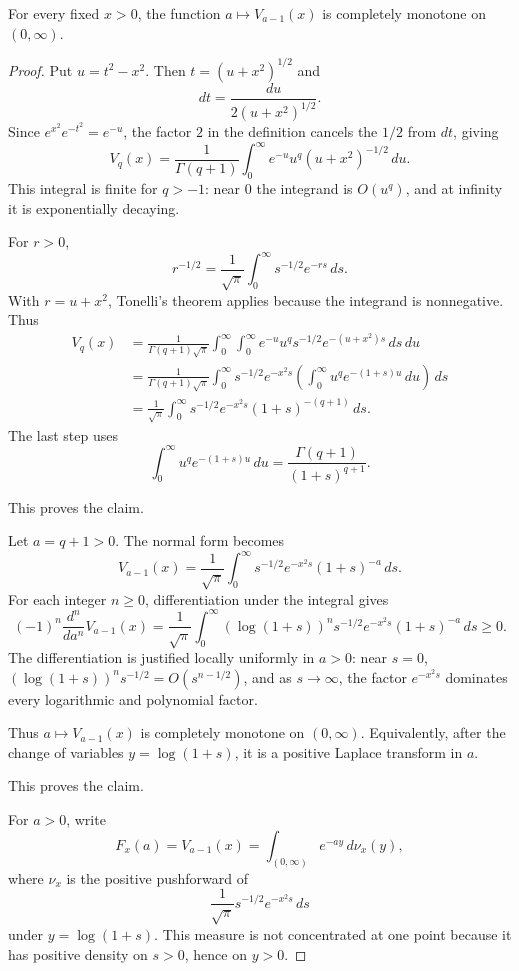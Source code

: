\begin{proposition}
\label{res:baricz-vq-q-complete-monotonicity}
For every fixed \(x>0\), the function \(a\mapsto V_{a-1}(x)\) is completely monotone on \((0,\infty)\).
\end{proposition}
\begin{proof}
Put \(u=t^2-x^2\). Then \(t=(u+x^2)^{1/2}\) and
\[
dt=\frac{du}{2(u+x^2)^{1/2}}.
\]
Since \(e^{x^2}e^{-t^2}=e^{-u}\), the factor \(2\) in the definition cancels the \(1/2\) from \(dt\), giving
\[
V_q(x)=\frac1{\Gamma(q+1)}
\int_0^\infty e^{-u}u^q(u+x^2)^{-1/2}\,du.
\]
This integral is finite for \(q>-1\): near \(0\) the integrand is \(O(u^q)\), and at infinity it is exponentially decaying.

For \(r>0\),
\[
r^{-1/2}=\frac1{\sqrt\pi}\int_0^\infty s^{-1/2}e^{-rs}\,ds.
\]
With \(r=u+x^2\), Tonelli's theorem applies because the integrand is nonnegative. Thus
\[
\begin{aligned}
V_q(x)
&=\frac1{\Gamma(q+1)\sqrt\pi}
\int_0^\infty\int_0^\infty
e^{-u}u^q s^{-1/2}e^{-(u+x^2)s}\,ds\,du\\
&=\frac1{\Gamma(q+1)\sqrt\pi}
\int_0^\infty s^{-1/2}e^{-x^2s}
\left(\int_0^\infty u^q e^{-(1+s)u}\,du\right)\,ds\\
&=\frac1{\sqrt\pi}\int_0^\infty
s^{-1/2}e^{-x^2s}(1+s)^{-(q+1)}\,ds.
\end{aligned}
\]
The last step uses
\[
\int_0^\infty u^q e^{-(1+s)u}\,du
=\frac{\Gamma(q+1)}{(1+s)^{q+1}}.
\]

This proves the claim.

Let \(a=q+1>0\). The normal form becomes
\[
V_{a-1}(x)=\frac1{\sqrt\pi}\int_0^\infty
s^{-1/2}e^{-x^2s}(1+s)^{-a}\,ds.
\]
For each integer \(n\ge0\), differentiation under the integral gives
\[
(-1)^n\frac{d^n}{da^n}V_{a-1}(x)
=\frac1{\sqrt\pi}\int_0^\infty
(\log(1+s))^n s^{-1/2}e^{-x^2s}(1+s)^{-a}\,ds\ge0.
\]
The differentiation is justified locally uniformly in \(a>0\): near \(s=0\), \((\log(1+s))^n s^{-1/2}=O(s^{n-1/2})\), and as \(s\to\infty\), the factor \(e^{-x^2s}\) dominates every logarithmic and polynomial factor.

Thus \(a\mapsto V_{a-1}(x)\) is completely monotone on \((0,\infty)\). Equivalently, after the change of variables \(y=\log(1+s)\), it is a positive Laplace transform in \(a\).

This proves the claim.

For \(a>0\), write
\[
F_x(a)=V_{a-1}(x)
=\int_{(0,\infty)} e^{-ay}\,d\nu_x(y),
\]
where \(\nu_x\) is the positive pushforward of
\[
\frac1{\sqrt\pi}s^{-1/2}e^{-x^2s}\,ds
\]
under \(y=\log(1+s)\). This measure is not concentrated at one point because it has positive density on \(s>0\), hence on \(y>0\).


\end{proof}
